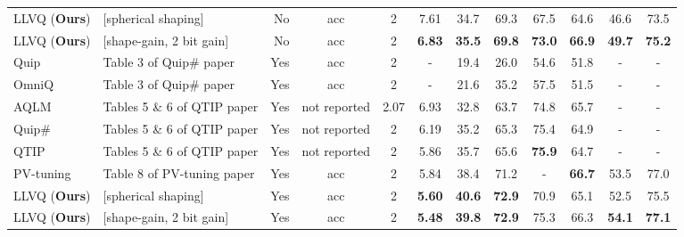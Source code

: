 \documentclass{article}
\theoremstyle{plain}
\theoremstyle{definition}
\theoremstyle{remark}
\begin{document}
\begin{table}[t]
{\begin{tabular}{l l r c c | c c c c c c c }
LLVQ (\textbf{Ours}) &
[spherical shaping]
& No & acc & 2 & 7.61 & 34.7 & 69.3 & 67.5 & 64.6 & 46.6 & 73.5 \\
LLVQ (\textbf{Ours}) &
[shape-gain, 2 bit gain]
& No & acc & 2 & \textbf{6.83} & 
\textbf{35.5} & \textbf{69.8} & \textbf{73.0} & \textbf{66.9} & \textbf{49.7} & \textbf{75.2} \\
\hline
\hline
Quip &  Table 3 of Quip\# paper & Yes & acc & 2 & - & 19.4 & 26.0 & 54.6 & 51.8 & - & - \\
OmniQ & Table 3 of Quip\# paper & Yes & acc & 2 & - & 21.6 & 35.2 & 57.5 & 51.5 & - & - \\
AQLM & Tables 5 \& 6 of QTIP paper & Yes & not reported & 2.07 & 6.93 & 32.8 & 63.7 & 74.8 & 65.7 & - & - \\
Quip\# & Tables 5 \& 6 of QTIP paper & Yes & not reported & 2 & 6.19 & 35.2 & 65.3 & 75.4 & 64.9 & - & - \\
QTIP & Tables 5 \& 6 of QTIP paper & Yes & not reported & 2 & 5.86 & 35.7 & 65.6 & \textbf{75.9} & 64.7 & - & - \\
PV-tuning & Table 8 of PV-tuning paper & Yes & acc & 2 & 5.84 & 38.4 & 71.2 & - & \textbf{66.7} & 53.5 & 77.0 \\
\hline
LLVQ (\textbf{Ours}) &
[spherical shaping]
& Yes & acc & 2 & \textbf{5.60} & \textbf{40.6} & \textbf{72.9} & 70.9 & 65.1 & 52.5 & 75.5 \\
LLVQ (\textbf{Ours}) &
[shape-gain, 2 bit gain]
& Yes & acc & 2 & \textbf{5.48} & \textbf{39.8} & \textbf{72.9} & 75.3 & 66.3 & \textbf{54.1} & \textbf{77.1} \\
\hline
\end{tabular}
}
\vspace{-1.0em}
\end{table}
\end{document}
